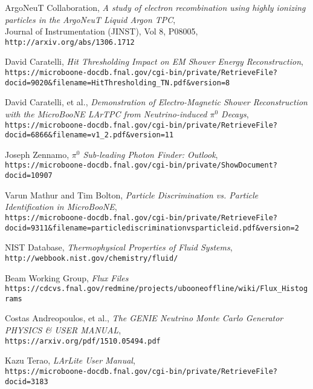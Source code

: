 \begin{thebibliography}{20}
  ArgoNeuT Collaboration, \emph{A study of electron recombination using highly ionizing particles in the ArgoNeuT Liquid Argon TPC},\\
  Journal of Instrumentation (JINST), Vol 8, P08005, \texttt{http://arxiv.org/abs/1306.1712}
  
  David Caratelli, \emph{Hit Thresholding Impact on EM Shower Energy Reconstruction},\\
  \texttt{https://microboone-docdb.fnal.gov/cgi-bin/private/RetrieveFile?docid=9020\&filename=HitThresholding\_TN.pdf\&version=8}

  David Caratelli, et al., \emph{Demonstration of Electro-Magnetic Shower Reconstruction with
the MicroBooNE LArTPC from Neutrino-induced $\pi^0$ Decays},\\
  \texttt{https://microboone-docdb.fnal.gov/cgi-bin/private/RetrieveFile?docid=6866\&filename=v1\_2.pdf\&version=11}
  
  Joseph Zennamo, \emph{$\pi^0$ Sub-leading Photon Finder: Outlook},\\
  \texttt{https://microboone-docdb.fnal.gov/cgi-bin/private/ShowDocument?docid=10907}
 
  
  Varun Mathur and Tim Bolton, \emph{Particle Discrimination vs. Particle Identification in MicroBooNE},\\
  \texttt{https://microboone-docdb.fnal.gov/cgi-bin/private/RetrieveFile?docid=9311\&filename=particlediscriminationvsparticleid.pdf\&version=2}

 NIST Database, \emph{Thermophysical Properties of Fluid Systems},\\
  \texttt{http://webbook.nist.gov/chemistry/fluid/}

  Beam Working Group, \emph{Flux Files}\\
  \texttt{https://cdcvs.fnal.gov/redmine/projects/ubooneoffline/wiki/Flux\_Histograms}

  Costas Andreopoulos, et al., \emph{The GENIE Neutrino Monte Carlo Generator PHYSICS \& USER MANUAL},\\
  \texttt{https://arxiv.org/pdf/1510.05494.pdf}

  Kazu Terao, \emph{LArLite User Manual},\\
  \texttt{https://microboone-docdb.fnal.gov/cgi-bin/private/RetrieveFile?docid=3183}


\end{thebibliography}
